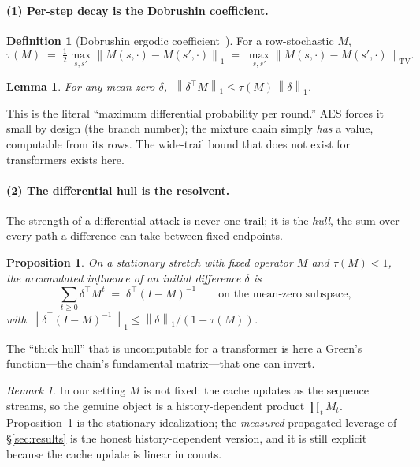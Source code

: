 \documentclass[11pt]{article}
\theoremstyle{plain}
\newtheorem{proposition}{Proposition}
\newtheorem{lemma}{Lemma}
\theoremstyle{definition}
\newtheorem{definition}{Definition}
\theoremstyle{remark}
\newtheorem{remark}{Remark}
\newcommand{\norm}[1]{\left\lVert #1 \right\rVert}
\newcommand{\TV}{\mathrm{TV}}
\begin{document}
\paragraph{(1) Per-step decay is the Dobrushin coefficient.}
\begin{definition}[Dobrushin ergodic coefficient~\cite{dobrushin1956}]
For a row-stochastic $M$,
\[
\tau(M)\;=\;\tfrac12\max_{s,s'}\norm{M(s,\cdot)-M(s',\cdot)}_1
\;=\;\max_{s,s'}\norm{M(s,\cdot)-M(s',\cdot)}_{\TV}.
\]
\end{definition}
\begin{lemma}\label{lem:dob}
For any mean-zero $\delta$, $\;\norm{\delta^{\!\top}M}_1\le \tau(M)\,\norm{\delta}_1$.
\end{lemma}
This is the literal ``maximum differential probability per round.'' AES forces it small by
design (the branch number); the mixture chain simply \emph{has} a value, computable from its
rows. The wide-trail bound that does not exist for transformers exists here.

\paragraph{(2) The differential hull is the resolvent.}
The strength of a differential attack is never one trail; it is the \emph{hull}, the sum
over every path a difference can take between fixed endpoints.
\begin{proposition}\label{prop:hull}
On a stationary stretch with fixed operator $M$ and $\tau(M)<1$, the accumulated influence
of an initial difference $\delta$ is
\[
\sum_{t\ge 0}\delta^{\!\top}M^{t}\;=\;\delta^{\!\top}(I-M)^{-1}
\qquad\text{on the mean-zero subspace,}
\]
with $\norm{\delta^{\!\top}(I-M)^{-1}}_1\le \norm{\delta}_1/(1-\tau(M))$.
\end{proposition}
The ``thick hull'' that is uncomputable for a transformer is here a Green's function---the
chain's fundamental matrix---that one can invert.
\begin{remark}
In our setting $M$ is not fixed: the cache updates as the sequence streams, so the genuine
object is a history-dependent product $\prod_t M_t$. Proposition~\ref{prop:hull} is the
stationary idealization; the \emph{measured} propagated leverage of \S\ref{sec:results} is
the honest history-dependent version, and it is still explicit because the cache update is
linear in counts.
\end{remark}
\end{document}
